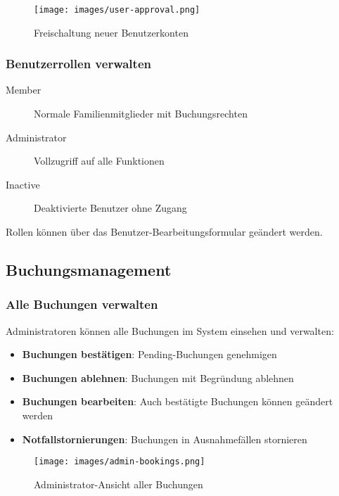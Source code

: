 \begin{figure}[H]
    \centering
    \texttt{[image: images/user-approval.png]}
    \caption{Freischaltung neuer Benutzerkonten}
    \label{fig:user-approval}
\end{figure}

\subsubsection{Benutzerrollen verwalten}

\begin{description}
    \item[Member] Normale Familienmitglieder mit Buchungsrechten
    \item[Administrator] Vollzugriff auf alle Funktionen
    \item[Inactive] Deaktivierte Benutzer ohne Zugang
\end{description}

Rollen können über das Benutzer-Bearbeitungsformular geändert werden.

\subsection{Buchungsmanagement}

\subsubsection{Alle Buchungen verwalten}

Administratoren können alle Buchungen im System einsehen und verwalten:

\begin{itemize}
    \item \textbf{Buchungen bestätigen}: Pending-Buchungen genehmigen
    \item \textbf{Buchungen ablehnen}: Buchungen mit Begründung ablehnen
    \item \textbf{Buchungen bearbeiten}: Auch bestätigte Buchungen können geändert werden
    \item \textbf{Notfallstornierungen}: Buchungen in Ausnahmefällen stornieren
\end{itemize}

\begin{figure}[H]
    \centering
    \texttt{[image: images/admin-bookings.png]}
    \caption{Administrator-Ansicht aller Buchungen}
    \label{fig:admin-bookings}
\end{figure}

